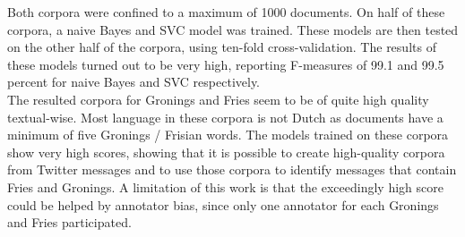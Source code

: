 \documentclass[
10pt, %
a4paper, %
oneside, %
headinclude,footinclude, %
] {book}%
\begin{document}
Both corpora were confined to a maximum of 1000 documents. On half of these corpora, a naive Bayes and SVC model was trained. These models are then tested on the other half of the corpora, using ten-fold cross-validation. The results of these models turned out to be very high, reporting F-measures of 99.1 and 99.5 percent for naive Bayes and SVC respectively. \\

The resulted corpora for Gronings and Fries seem to be of quite high quality textual-wise. Most language in these corpora is not Dutch as documents have a minimum of five Gronings / Frisian words. The models trained on these corpora show very high scores, showing that it is possible to create high-quality corpora from Twitter messages and to use those corpora to identify messages that contain Fries and Gronings.
A limitation of this work is that the exceedingly high score could be helped by annotator bias, since only one annotator for each Gronings and Fries participated. 

 

\end{document}
